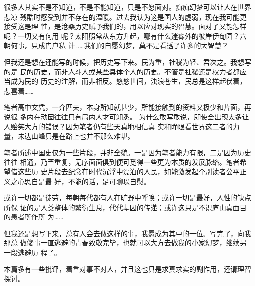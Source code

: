 很多人其实不是不知道，不是不能知道，只是不愿面对。痴痴幻梦可以让人在世界悲凉
残酷时感受到并不存在的温暖。过去我认为这是国人的虚弱，现在我可能更接受这是理
性，是沧桑历史赋予我们的，用以应对现实的智慧。面对了又能怎样呢？一切又有何用
呢？太阳照常从东方升起，哪有什么迷雾外的彼岸伊甸园？六朝何事，只成门户私
计……我们的自愿幻梦，莫不是看透了许多的大智慧？

但我还是想在还能写的时候，把历史写下来。民为重，社稷为轻、君次之。我想写的是
民的历史，而非人斗人或某些具体个人的历史。不管是社稷还是权力者都应当成为民的
历史的注解，而非相反。悠悠世间，浊浪苍生，民总是这样起伏着，悲喜着……

笔者高中文凭，一介匹夫，本身所知就甚少，所能接触到的资料又极少和片面，再说很
多内在动因往往只有局内人才可知悉。%
为什么敢写敢说，即使会出现太多让人贻笑大方的错误？因为笔者仍有些天真地相信真
实和睁眼看世界这二者的力量，未达山峰只是在路上也并不那么难堪。

笔者所述中国史仅为一些片段，并非全貌。一是因为笔者能力有限，二是因为历史往往
相通，乃至重复，无序面面俱到便可觅得一些更为本质的发展脉络。笔者希望借这些历
史片段去纪念在时代沉浮中漂泊的人民，如能激发起个别读者公平正义之心思自是最
好，不能的话，足可聊以自慰。

或许一切都是徒劳，每朝每代都有人在旷野中呼唤；或许一切是最好，人性的缺点所保
证的是人类整体的繁衍生息，代代基因的传递；或许这只是不识庐山真面目的愚者所作所
为……

但我还是想写下来，总有人会去做这样的事，我愿成为其中的一位。写完了，向我那总
做傻事一直逃避的青春致敬完毕，也就可以大方去做我的小家幻梦，继续另一段逃避历
程了。


本篇多有一些批评，着重对事不对人，并且这也只是求真求实的副作用，还请理智探讨。






